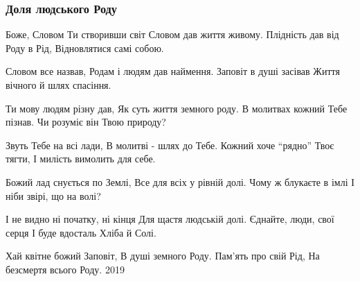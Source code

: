  
 
 

\subsubsection{Доля людського Роду}
\label{sec:poetry.rus.sokor.dolja_ludskogo_rodu}

Боже, Словом Ти створивши світ
Словом дав життя живому.
Плідність дав від Роду в Рід,
Відновлятися самі собою.

Словом все назвав,
Родам і людям дав наймення.
Заповіт в душі засівав
Життя вічного й шлях спасіння.

Ти мову людям різну дав,
Як суть життя земного роду.
В молитвах кожний Тебе пізнав.
Чи розуміє він Твою природу?

Звуть Тебе на всі лади,
В молитві - шлях до Тебе.
Кожний хоче “рядно” Твоє тягти,
І милість вимолить для себе.

Божий лад снується по Землі,
Все для всіх у рівній долі.
Чому ж блукаєте в імлі
І ніби звірі, що на волі?

І не видно ні початку, ні кінця
Для щастя людській долі.
Єднайте, люди, свої серця
І буде вдосталь Хліба й Солі.

Хай квітне божий Заповіт,
В душі земного Роду.
Пам'ять про свій Рід,
На безсмертя всього Роду.
2019 
